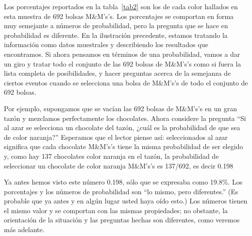 \documentclass[letterpaper,10pt,twoside]{article}
\begin{document}
Los porcentajes reportados en la tabla~\ref{tab2} son los de cada color hallados en esta
muestra de 692 bolsas M\&M's’s. Los porcentajes se comportan en forma muy semejante a números de probabilidad, pero la pregunta que se hace en probabilidad es diferente. En la ilustración precedente, estamos tratando la información como datos muestrales y describiendo los resultados que encontramos. Si ahora pensamos
en términos de una probabilidad, vamos a dar un giro y tratar todo el conjunto de
las 692 bolsas de M\&M's’s como si fuera la lista completa de posibilidades, y hacer
preguntas acerca de la semejanza de ciertos eventos cuando se selecciona una bolsa
de M\&M's’s de todo el conjunto de 692 bolsas.

Por ejemplo, supongamos que se vacían las 692 bolsas de M\&M's’s en un gran
tazón y mezclamos perfectamente los chocolates. Ahora considere la pregunta “Si
al azar se selecciona un chocolate del tazón, ¿cuál es la probabilidad de que sea de
color naranja?” Esperamos que el lector piense así: seleccionados al azar significa
que cada chocolate M\&M's’s tiene la misma probabilidad de ser elegido y, como hay
137 chocolates color naranja en el tazón, la probabilidad de seleccionar un chocolate de color naranja M\&M's’s es 137/692, es decir 0.198

Ya antes hemos visto este número 0.198, sólo que se expresaba como 19.8\%.
Los porcentajes y los números de probabilidad son “lo mismo, pero diferentes.” (Es
probable que ya antes y en algún lugar usted haya oído esto.) Los números tienen
el mismo valor y se comportan con las mismas propiedades; no obstante, la orientación de la situación y las preguntas hechas son diferentes, como veremos más adelante.
\end{document}
